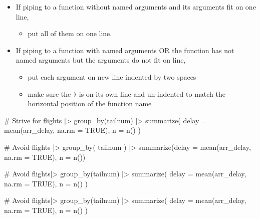 \documentclass[
  letterpaper,
  DIV=11,
  numbers=noendperiod]{scrreprt}
\newenvironment{Shaded}{\begin{snugshade}}{\end{snugshade}}
\newcommand{\AttributeTok}[1]{\textcolor[rgb]{0.40,0.45,0.13}{#1}}
\newcommand{\CommentTok}[1]{\textcolor[rgb]{0.37,0.37,0.37}{#1}}
\newcommand{\ConstantTok}[1]{\textcolor[rgb]{0.56,0.35,0.01}{#1}}
\newcommand{\FunctionTok}[1]{\textcolor[rgb]{0.28,0.35,0.67}{#1}}
\newcommand{\NormalTok}[1]{\textcolor[rgb]{0.00,0.23,0.31}{#1}}
\newcommand{\SpecialCharTok}[1]{\textcolor[rgb]{0.37,0.37,0.37}{#1}}
\providecommand{\tightlist}{%
  \setlength{\itemsep}{0pt}\setlength{\parskip}{0pt}}\usepackage{longtable,booktabs,array}
\begin{document}
\begin{itemize}
\tightlist
\item
  If piping to a function without named arguments and its arguments fit
  on one line,

  \begin{itemize}
  \tightlist
  \item
    put all of them on one line.
  \end{itemize}
\item
  If piping to a function with named arguments OR the function has not
  named arguments but the arguments do not fit on line,

  \begin{itemize}
  \tightlist
  \item
    put each argument on new line indented by two spaces
  \item
    make sure the \texttt{)} is on its own line and un-indented to match
    the horizontal position of the function name
  \end{itemize}
\end{itemize}

\begin{Shaded}
\begin{Highlighting}[]
\CommentTok{\# Strive for}
\NormalTok{flights }\SpecialCharTok{|\textgreater{}}  
  \FunctionTok{group\_by}\NormalTok{(tailnum) }\SpecialCharTok{|\textgreater{}} 
  \FunctionTok{summarize}\NormalTok{(}
    \AttributeTok{delay =} \FunctionTok{mean}\NormalTok{(arr\_delay, }\AttributeTok{na.rm =} \ConstantTok{TRUE}\NormalTok{),}
    \AttributeTok{n =} \FunctionTok{n}\NormalTok{()}
\NormalTok{  )}

\CommentTok{\# Avoid}
\NormalTok{flights }\SpecialCharTok{|\textgreater{}}
  \FunctionTok{group\_by}\NormalTok{(}
\NormalTok{    tailnum}
\NormalTok{  ) }\SpecialCharTok{|\textgreater{}} 
  \FunctionTok{summarize}\NormalTok{(}\AttributeTok{delay =} \FunctionTok{mean}\NormalTok{(arr\_delay, }\AttributeTok{na.rm =} \ConstantTok{TRUE}\NormalTok{), }\AttributeTok{n =} \FunctionTok{n}\NormalTok{())}

\CommentTok{\# Avoid}
\NormalTok{flights}\SpecialCharTok{|\textgreater{}}
  \FunctionTok{group\_by}\NormalTok{(tailnum) }\SpecialCharTok{|\textgreater{}} 
  \FunctionTok{summarize}\NormalTok{(}
             \AttributeTok{delay =} \FunctionTok{mean}\NormalTok{(arr\_delay, }\AttributeTok{na.rm =} \ConstantTok{TRUE}\NormalTok{), }
             \AttributeTok{n =} \FunctionTok{n}\NormalTok{()}
\NormalTok{           )}

\CommentTok{\# Avoid}
\NormalTok{flights}\SpecialCharTok{|\textgreater{}}
  \FunctionTok{group\_by}\NormalTok{(tailnum) }\SpecialCharTok{|\textgreater{}} 
  \FunctionTok{summarize}\NormalTok{(}
  \AttributeTok{delay =} \FunctionTok{mean}\NormalTok{(arr\_delay, }\AttributeTok{na.rm =} \ConstantTok{TRUE}\NormalTok{), }
  \AttributeTok{n =} \FunctionTok{n}\NormalTok{()}
\NormalTok{  )}
\end{Highlighting}
\end{Shaded}
\end{document}
